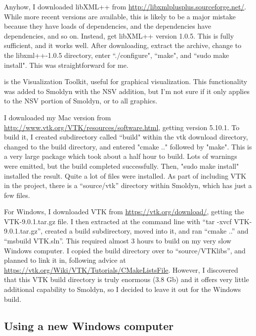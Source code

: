 \documentclass {scrbook}
\begin{document}
\begin{description}
Anyhow, I downloaded libXML++ from \url{http://libxmlplusplus.sourceforge.net/}. While more recent versions are available, this is likely to be a major mistake because they have loads of dependencies, and the dependencies have dependencies, and so on. Instead, get libXML++ version 1.0.5. This is fully sufficient, and it works well. After downloading, extract the archive, change to the libxml++-1.0.5 directory, enter ``./configure", ``make", and ``sudo make install". This was straightforward for me.

\item[vtk] is the Visualization Toolkit, useful for graphical visualization. This functionality was added to Smoldyn with the NSV addition, but I'm not sure if it only applies to the NSV portion of Smoldyn, or to all graphics.

I downloaded my Mac version from \url{http://www.vtk.org/VTK/resources/software.html}, getting version 5.10.1. To build it, I created subdirectory called ``build" within the vtk download directory, changed to the build directory, and entered "cmake .." followed by "make". This is a very large package which took about a half hour to build. Lots of warnings were emitted, but the build completed successfully. Then, "sudo make install" installed the result. Quite a lot of files were installed. As part of including VTK in the project, there is a ``source/vtk'' directory within Smoldyn, which has just a few files.

For Windows, I downloaded VTK from \url{https://vtk.org/download/}, getting the VTK-9.0.1.tar.gz file. I then extracted at the command line with ``tar -xvcf VTK-9.0.1.tar.gz'', created a build subdirectory, moved into it, and ran ``cmake ..'' and ``msbuild VTK.sln''. This required almost 3 hours to build on my very slow Windows computer. I copied the build directory over to ``source/VTKlibs'', and planned to link it in, following advice at \url{https://vtk.org/Wiki/VTK/Tutorials/CMakeListsFile}. However, I discovered that this VTK build directory is truly enormous (3.8 Gb) and it offers very little additional capability to Smoldyn, so I decided to leave it out for the Windows build.

\end{description}

\subsection{Using a new Windows computer}
\end{document}
